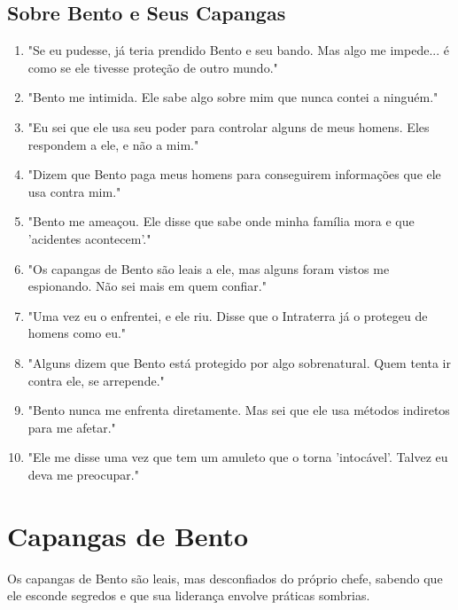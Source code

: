 \subsection*{Sobre Bento e Seus Capangas}
\begin{enumerate}
    \item "Se eu pudesse, já teria prendido Bento e seu bando. Mas algo me impede... é como se ele tivesse proteção de outro mundo."
    \item "Bento me intimida. Ele sabe algo sobre mim que nunca contei a ninguém."
    \item "Eu sei que ele usa seu poder para controlar alguns de meus homens. Eles respondem a ele, e não a mim."
    \item "Dizem que Bento paga meus homens para conseguirem informações que ele usa contra mim."
    \item "Bento me ameaçou. Ele disse que sabe onde minha família mora e que 'acidentes acontecem'."
    \item "Os capangas de Bento são leais a ele, mas alguns foram vistos me espionando. Não sei mais em quem confiar."
    \item "Uma vez eu o enfrentei, e ele riu. Disse que o Intraterra já o protegeu de homens como eu."
    \item "Alguns dizem que Bento está protegido por algo sobrenatural. Quem tenta ir contra ele, se arrepende."
    \item "Bento nunca me enfrenta diretamente. Mas sei que ele usa métodos indiretos para me afetar."
    \item "Ele me disse uma vez que tem um amuleto que o torna 'intocável'. Talvez eu deva me preocupar."
\end{enumerate}

\section{Capangas de Bento}
Os capangas de Bento são leais, mas desconfiados do próprio chefe, sabendo que ele esconde segredos e que sua liderança envolve práticas sombrias.

